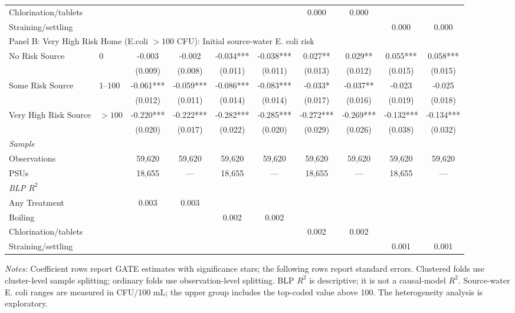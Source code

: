 \begin{landscape}
\begin{table}[p]
\begin{adjustbox}{max width=\linewidth, center}
\begin{tabular}{llcccccccc}
\quad Chlorination/tablets &  &  &  &  &  & 0.000 & 0.000 &  &  \\
\quad Straining/settling &  &  &  &  &  &  &  & 0.000 & 0.000 \\
\midrule
\multicolumn{10}{l}{Panel B: Very High Risk Home (E.coli $>100$ CFU): Initial source-water E. coli risk} \\
No Risk Source & 0 & -0.003 & -0.002 & -0.034*** & -0.038*** & 0.027** & 0.029** & 0.055*** & 0.058*** \\
 &  & (0.009) & (0.008) & (0.011) & (0.011) & (0.013) & (0.012) & (0.015) & (0.015) \\
Some Risk Source & 1--100 & -0.061*** & -0.059*** & -0.086*** & -0.083*** & -0.033* & -0.037** & -0.023 & -0.025 \\
 &  & (0.012) & (0.011) & (0.014) & (0.014) & (0.017) & (0.016) & (0.019) & (0.018) \\
Very High Risk Source & $>100$ & -0.220*** & -0.222*** & -0.282*** & -0.285*** & -0.272*** & -0.269*** & -0.132*** & -0.134*** \\
 &  & (0.020) & (0.017) & (0.022) & (0.020) & (0.029) & (0.026) & (0.038) & (0.032) \\
\multicolumn{10}{l}{\textit{Sample}} \\
\quad Observations &  & 59,620 & 59,620 & 59,620 & 59,620 & 59,620 & 59,620 & 59,620 & 59,620 \\
\quad PSUs &  & 18,655 & --- & 18,655 & --- & 18,655 & --- & 18,655 & --- \\
\multicolumn{10}{l}{\textit{BLP $R^{2}$}} \\
\quad Any Treatment &  & 0.003 & 0.003 &  &  &  &  &  &  \\
\quad Boiling &  &  &  & 0.002 & 0.002 &  &  &  &  \\
\quad Chlorination/tablets &  &  &  &  &  & 0.002 & 0.002 &  &  \\
\quad Straining/settling &  &  &  &  &  &  &  & 0.001 & 0.001 \\
\bottomrule
\end{tabular}
\end{adjustbox}
\par\vspace{3pt}
\begin{minipage}{\linewidth}\footnotesize \textit{Notes:} Coefficient rows report GATE estimates with significance stars; the following rows report standard errors. Clustered folds use cluster-level sample splitting; ordinary folds use observation-level splitting. BLP $R^2$ is descriptive; it is not a causal-model $R^2$. Source-water E. coli ranges are measured in CFU/100 mL; the upper group includes the top-coded value above 100. The heterogeneity analysis is exploratory.\end{minipage}
\end{table}
\end{landscape}